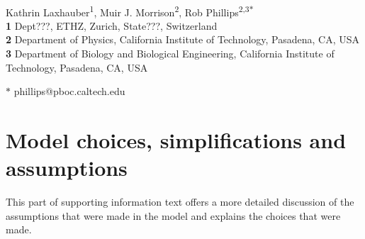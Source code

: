 \documentclass[10pt,letterpaper]{article}
\begin{document}
	
\begin{flushleft}
	{\Large
		\textbf{}
	}
	\newline
	\\
	Kathrin Laxhauber\textsuperscript{1},
	Muir J. Morrison\textsuperscript{2},
	Rob Phillips\textsuperscript{2,3$\ast$}
	\\
	\bigskip
	\textbf{1} Dept???, ETHZ, Zurich, State???, Switzerland
	\\
	\textbf{2} Department of Physics, California Institute of Technology, Pasadena, CA, USA
	\\
	\textbf{3} Department of Biology and Biological Engineering, California Institute of Technology, Pasadena, CA, USA
	\\
	\bigskip
	
	
	
	
	$\ast$ phillips@pboc.caltech.edu
	
\end{flushleft}	

\newpage
\linenumbers

\section{Model choices, simplifications and assumptions}
This part of supporting information text offers a more detailed discussion
of the assumptions that were made in the model and explains the choices that
were made.
\end{document}
